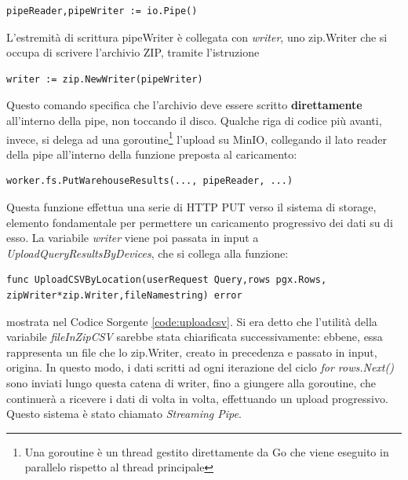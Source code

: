 \begin{verbatim}
pipeReader,pipeWriter := io.Pipe()
\end{verbatim}
L'estremità di scrittura pipeWriter è collegata con \textit{writer}, uno zip.Writer che si occupa di scrivere l'archivio ZIP, tramite l'istruzione 
\begin{verbatim}
writer := zip.NewWriter(pipeWriter)
\end{verbatim}
Questo comando specifica che l'archivio deve essere scritto \textbf{direttamente} all'interno della pipe, non toccando il disco.
Qualche riga di codice più avanti, invece, si delega ad una goroutine\footnote{Una goroutine è un thread gestito direttamente da Go che viene eseguito in parallelo rispetto al thread principale} l'upload su MinIO, collegando il lato reader della pipe all'interno della funzione preposta al caricamento:
\begin{verbatim}
worker.fs.PutWarehouseResults(..., pipeReader, ...)
\end{verbatim}
Questa funzione effettua una serie di HTTP PUT verso il sistema di storage, elemento fondamentale per permettere un caricamento progressivo dei dati su di esso.
La variabile \textit{writer} viene poi passata in input a \textit{UploadQueryResultsByDevices}, che si collega alla funzione:
\begin{verbatim}
func UploadCSVByLocation(userRequest Query,rows pgx.Rows,
zipWriter*zip.Writer,fileNamestring) error
\end{verbatim}
mostrata nel Codice Sorgente \ref{code:uploadcsv}. Si era detto che l'utilità della variabile \textit{fileInZipCSV} sarebbe stata chiarificata successivamente: ebbene, essa rappresenta un file che lo zip.Writer, creato in precedenza e passato in input, origina. In questo modo, i dati scritti ad ogni iterazione del ciclo \textit{for rows.Next()} sono inviati lungo questa catena di writer, fino a giungere alla goroutine, che continuerà a ricevere i dati di volta in volta, effettuando un upload progressivo. Questo sistema è stato chiamato \textit{Streaming Pipe}.

